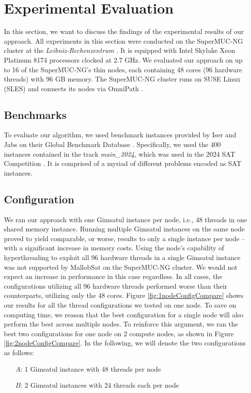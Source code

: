 \documentclass[12pt,a4paper,twoside]{scrartcl}
\numberwithin{equation}{section}
\begin{document}

\section{Experimental Evaluation}

In this section, we want to discuss the findings of the experimental results of our approach. All experiments in this section were conducted on the SuperMUC-NG cluster at the \textit{Leibniz-Rechenzentrum} \cite{superMUC}. It is equipped with Intel Skylake Xeon Platinum 8174 processors clocked at 2.7 GHz. We evaluated our approach on up to 16 of the SuperMUC-NG's thin nodes, each containing 48 cores (96 hardware threads) with 96 GB memory. The SuperMUC-NG cluster runs on SUSE Linux (SLES) and connects its nodes via OmniPath \cite{omniPath}.

\subsection{Benchmarks}
To evaluate our algorithm, we used benchmark instances provided by Iser and Jabs on their Global Benchmark Database \cite{benchmarkDB}. Specifically, we used the 400 instances contained in the track \textit{main\_2024}, which was used in the 2024 SAT Competition \cite{satComp2024}. It is comprised of a myriad of different problems encoded as SAT instances.

\subsection{Configuration}
We ran our approach with one Gimsatul instance per node, i.e., 48 threads in one shared memory instance. Running multiple Gimsatul instances on the same node proved to yield comparable, or worse, results to only a single instance per node -- with a significant increase in memory costs. Using the node's capability of hyperthreading to exploit all 96 hardware threads in a single Gimsatul instance was not supported by MallobSat on the SuperMUC-NG cluster. We would not expect an increase in performance in this case regardless. In all cases, the configurations utilizing all 96 hardware threads performed worse than their counterparts, utilizing only the 48 cores. Figure \ref{fig:1nodeConfigCompare} shows our results for all the thread configurations we tested on one node. To save on computing time, we reason that the best configuration for a single node will also perform the best across multiple nodes. To reinforce this argument, we ran the best two configurations for one node on 2 compute nodes, as shown in Figure \ref{fig:2nodeConfigCompare}. In the following, we will denote the two configurations as follows:
\begin{itemize}
  \item[$A$:] 1 Gimsatul instance with 48 threads per node
  \item[$B$:] 2 Gimsatul instances with 24 threads each per node
\end{itemize}
\end{document}
